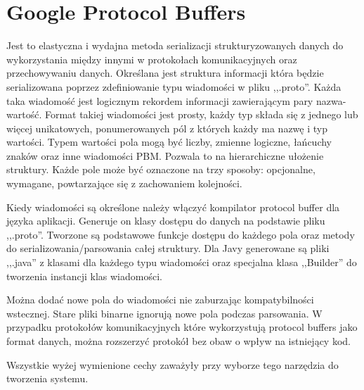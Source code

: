 \section{Google Protocol Buffers} \label{protobuf}

\par{Jest to elastyczna i wydajna metoda serializacji strukturyzowanych danych do wykorzystania między innymi w protokołach komunikacyjnych oraz przechowywaniu danych. Określana jest struktura informacji która będzie serializowana poprzez zdefiniowanie typu wiadomości w pliku ,,.proto''. Każda taka wiadomość jest logicznym rekordem informacji zawierającym pary nazwa-wartość. Format takiej wiadomości jest prosty, każdy typ składa się z jednego lub więcej unikatowych, ponumerowanych pól z których każdy ma nazwę i typ wartości. Typem wartości pola mogą być liczby, zmienne logiczne, łańcuchy znaków oraz inne wiadomości PBM. Pozwala to na hierarchiczne ułożenie struktury. Każde pole może być oznaczone na trzy sposoby: opcjonalne, wymagane, powtarzające się z zachowaniem kolejności.}

\par{Kiedy wiadomości są określone należy włączyć kompilator protocol buffer dla języka aplikacji. Generuje on klasy dostępu do danych na podstawie pliku ,,.proto''. Tworzone są podstawowe funkcje dostępu do każdego pola oraz metody do serializowania/parsowania całej struktury. Dla Javy generowane są pliki ,,.java'' z klasami dla każdego typu wiadomości oraz specjalna klasa ,,Builder'' do tworzenia instancji klas wiadomości.}

\par{Można dodać nowe pola do wiadomości nie zaburzając kompatybilności wstecznej. Stare pliki binarne ignorują nowe pola podczas parsowania. W przypadku protokołów komunikacyjnych które wykorzystują protocol buffers jako format danych, można rozszerzyć protokół bez obaw o wpływ na istniejący kod.}

\par{Wszystkie wyżej wymienione cechy zaważyły przy wyborze tego narzędzia do tworzenia systemu.}
